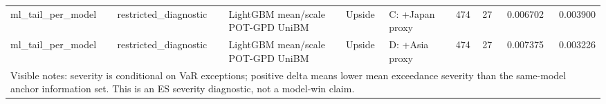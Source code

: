 \begin{tabular}{lllllrrrr}
ml\_tail\_per\_model & restricted\_diagnostic & LightGBM mean/scale POT-GPD UniBM & Upside & C: +Japan proxy & 474 & 27 & 0.006702 & 0.003900 \\
ml\_tail\_per\_model & restricted\_diagnostic & LightGBM mean/scale POT-GPD UniBM & Upside & D: +Asia proxy & 474 & 27 & 0.007375 & 0.003226 \\
\midrule
\multicolumn{9}{l}{\footnotesize Visible notes: severity is conditional on VaR exceptions; positive delta means lower mean exceedance severity than the same-model anchor information set. This is an ES severity diagnostic, not a model-win claim.} \\
\bottomrule
\end{tabular}
